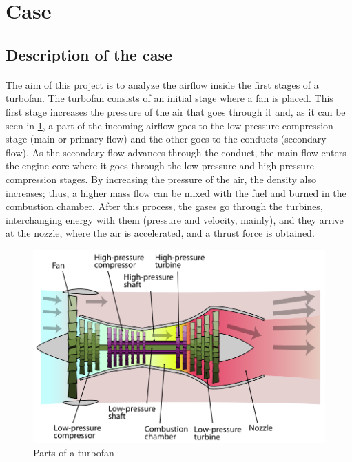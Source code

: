 \section{Case}

\subsection{Description of the case}

\paragraph{}The aim of this project is to analyze the airflow inside the first stages of a turbofan. The turbofan consists of an initial stage where a fan is placed. This first stage increases the pressure of the air that goes through it and, as it can be seen in \ref{turbofanparts}, a part of the incoming airflow goes to the low pressure compression stage (main or primary flow) and the other goes to the conducts (secondary flow). As the secondary flow advances through the conduct, the main flow enters the engine core where it goes through the low pressure and high pressure compression stages. By increasing the pressure of the air, the density also increases; thus, a higher mass flow can be mixed with the fuel and burned in the combustion chamber. After this process, the gases go through the turbines, interchanging energy with them (pressure and velocity, mainly), and they arrive at the nozzle, where the air is accelerated, and a thrust force is obtained.

\begin{figure}[h!]
\centering
\includegraphics[scale=0.45]{./img/TurbofanEtapas.png}
\caption{Parts of a turbofan}
\label{turbofanparts}
\end{figure}

